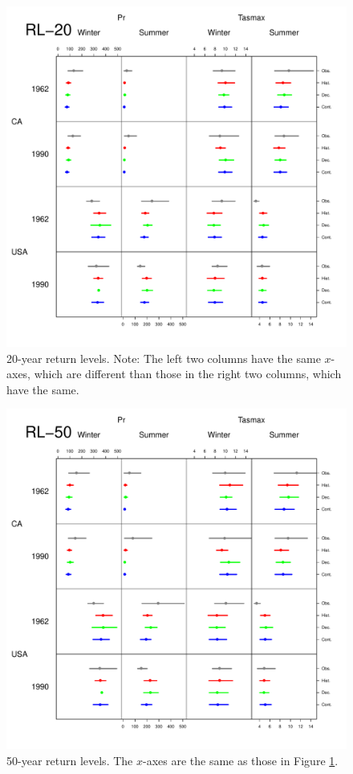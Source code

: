 \documentclass[12pt]{article}
\begin{document}
\begin{figure}
\begin{center}
\includegraphics[scale=0.72]{figs/rl20.pdf}
\end{center}
\caption{20-year return levels. Note: The left two columns have the same $x$-axes, which are different than those in the right two columns, which have the same.}
\label{20rl}
\end{figure}

\begin{figure}
\begin{center}
\includegraphics[scale=0.72]{figs/rl50.pdf}
\end{center}
\caption{50-year return levels. The $x$-axes are the same as those in Figure \ref{20rl}.}
\label{50rl}
\end{figure}
\end{document}
